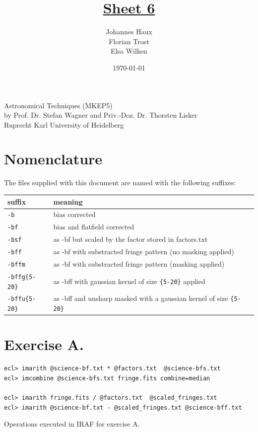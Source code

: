 \documentclass[11pt,a4paper,twoside]{article}
\title{\LARGE \underline {Sheet 6}}
\author{Johannes Haux \\ Florian Trost \\ Elsa Wilken}
\date{\today}
\begin{document}
\maketitle
\thispagestyle{empty}

\begin{center}
  Astronomical Techniques (MKEP5) \\
  \baselineskip35pt
  by Prof. Dr. Stefan Wagner and Priv.-Doz. Dr. Thorsten Lisker \\
  \baselineskip60pt
  Ruprecht Karl University of Heidelberg
\vskip 40pt

\end{center}

\newpage
\setcounter{page}{1}		%

\section*{Nomenclature}
The files supplied with this document are named with the following suffixes:
\begin{table}[h!]
\begin{tabular}{ll}\toprule
suffix          & meaning \\ \midrule
\verb+-b+       & bias corrected \\
\verb+-bf+      & bias and flatfield corrected	\\
\verb+-bsf+     & as -bf but scaled by the factor stored in factors.txt	\\
\verb+-bff+     & as -bf with substracted fringe pattern (no masking applied)	\\
\verb+-bffm+    & as -bf with substracted fringe pattern (masking applied)	\\
\verb+-bffg{5-20}+    & as -bff with gaussian kernel of size \verb+{5-20}+ applied	\\
\verb+-bffu{5-20}+    & as -bff and unsharp masked with a gaussian kernel of size \verb+{5-20}+	\\
\bottomrule
\end{tabular}
\end{table}


\section*{Exercise A.}

\begin{listing}[h!]
\begin{verbatim}
ecl> imarith @science-bf.txt * @factors.txt  @science-bfs.txt
ecl> imcombine @science-bfs.txt fringe.fits combine=median

ecl> imarith fringe.fits / @factors.txt  @scaled_fringes.txt
ecl> imarith @science-bf.txt - @scaled_fringes.txt @science-bff.txt
\end{verbatim}
\caption{Operations executed in IRAF for exercise A.}
\label{fig:ca}
\end{listing}
\end{document}
